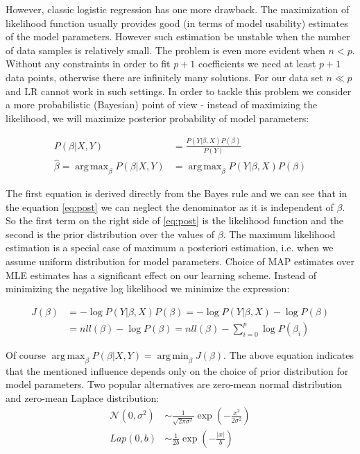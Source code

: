 \documentclass[12pt, wide]{mwart}
\DeclareMathOperator*{\argmax}{arg\,max}
\DeclareMathOperator*{\argmin}{arg\,min}
\begin{document}
However, classic logistic regression has one more drawback. The maximization of likelihood function usually provides good (in terms of model usability) estimates of the model parameters. However such estimation be unstable when the number of data samples is relatively small. The problem is even more evident when $n < p$. Without any constraints in order to fit $p+1$ coefficients we need at least $p+1$ data points, otherwise there are infinitely many solutions. For our data set $n \ll p$ and LR cannot work in such settings. In order to tackle this problem we consider a more probabilistic (Bayesian) point of view - instead of maximizing the likelihood, we will maximize posterior probability of model parameters:

\begin{align}
    P(\beta| X,Y) &= \frac{P(Y | \beta, X)P(\beta)}{P(Y)} \nonumber \\
    \hat{\beta} = \argmax_{\beta} P(\beta| X,Y) &= \argmax_{\beta} P(Y | \beta, X)P(\beta) \label{eq:post}
\end{align}

The first equation is derived directly from the Bayes rule and we can see that in the equation \ref{eq:post} we can neglect the denominator as it is independent of $\beta$. So the first term on the right side of \ref{eq:post} is the likelihood function and the second is the prior distribution over the values of $\beta$. The maximum likelihood estimation is a special case of maximum a posteriori estimation, i.e. when we assume uniform distribution for model parameters.  Choice of MAP estimates over MLE estimates has a significant effect on our learning scheme. Instead of minimizing the negative log likelihood we minimize the expression:

\begin{align}
    J(\beta) &= - \log P(Y | \beta, X)P(\beta) =  - \log P(Y | \beta, X) - \log P(\beta) \nonumber \\ &= nll(\beta) - \log P(\beta) = nll(\beta) - \sum_{i=0}^p \log P(\beta_i) \label{eq:learnPost}
\end{align}

Of course $\argmax_{\beta} P(\beta| X,Y) = \argmin_{\beta} J(\beta)$. The above equation indicates that the mentioned influence depends only on the choice of prior distribution for model parameters. Two popular alternatives are zero-mean normal distribution and zero-mean Laplace distribution:
\begin{align*}
    \mathcal{N}(0, \sigma^2) &\sim \frac{1}{\sqrt{2 \pi \sigma^{2}}} \exp \left(-\frac{x^{2}}{2 \sigma^{2}}\right) \\
    Lap(0, b) &\sim \frac{1}{2 b} \exp \left(-\frac{|x|}{b}\right)
\end{align*}
\end{document}
